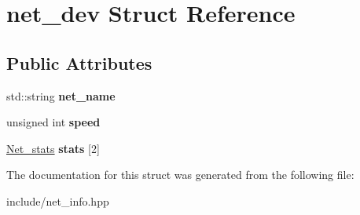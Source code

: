 \hypertarget{structnet__dev}{}\section{net\+\_\+dev Struct Reference}
\label{structnet__dev}
\subsection*{Public Attributes}
\begin{DoxyCompactItemize}
\item 
\mbox{\label{structnet__dev_a944e712b60ed25a28464d33b31929fe6}} 
std\+::string {\bfseries net\+\_\+name}
\item 
\mbox{\label{structnet__dev_ab73bc9d31f580e9dc31486a59d480251}} 
unsigned int {\bfseries speed}
\item 
\mbox{\label{structnet__dev_ae4d96fe01a6c24cc6a41d92c4525d304}} 
\mbox{\hyperlink{structnet__stats}{Net\+\_\+stats}} {\bfseries stats} \mbox{[}2\mbox{]}
\end{DoxyCompactItemize}


The documentation for this struct was generated from the following file\+:\begin{DoxyCompactItemize}
\item 
include/net\+\_\+info.\+hpp\end{DoxyCompactItemize}
